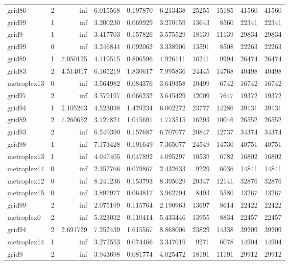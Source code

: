 \begin{longtable}{|l|r|r|r|r|r|r|r|r|r|}
grid86 & 2 & inf & 6.015568 & 0.197870 & 6.213438 & 25255 & 15185 & 41560 & 41560 \\
grid99 & 1 & inf & 3.200230 & 0.069929 & 3.270159 & 13643 & 8560 & 22341 & 22341 \\
grid9 & 1 & inf & 3.417703 & 0.157826 & 3.575529 & 18139 & 11139 & 29834 & 29834 \\
grid99 & 0 & inf & 3.246844 & 0.092062 & 3.338906 & 13591 & 8508 & 22263 & 22263 \\
grid89 & 1 & 7.050125 & 4.119515 & 0.806596 & 4.926111 & 16241 & 9994 & 26474 & 26474 \\
grid83 & 2 & 4.514017 & 6.165219 & 1.830617 & 7.995836 & 24445 & 14768 & 40498 & 40498 \\
metroplex13 & 0 & inf & 3.564982 & 0.084376 & 3.649358 & 10499 & 6742 & 16742 & 16742 \\
grid97 & 2 & inf & 3.579197 & 0.066232 & 3.645429 & 12009 & 7647 & 19372 & 19372 \\
grid94 & 1 & 2.105263 & 4.523038 & 1.479234 & 6.002272 & 23777 & 14286 & 39131 & 39131 \\
grid89 & 2 & 7.260652 & 3.727824 & 1.045691 & 4.773515 & 16293 & 10046 & 26552 & 26552 \\
grid93 & 2 & inf & 6.549390 & 0.157687 & 6.707077 & 20847 & 12737 & 34374 & 34374 \\
grid98 & 1 & inf & 7.173428 & 0.191649 & 7.365077 & 24549 & 14730 & 40751 & 40751 \\
metroplex13 & 1 & inf & 4.047405 & 0.047892 & 4.095297 & 10539 & 6782 & 16802 & 16802 \\
metroplex14 & 0 & inf & 2.352766 & 0.079867 & 2.432633 & 9229 & 6036 & 14841 & 14841 \\
metroplex12 & 0 & inf & 8.241236 & 0.153793 & 8.395029 & 20347 & 12141 & 32876 & 32876 \\
metroplex15 & 0 & inf & 3.897977 & 0.064817 & 3.962794 & 8493 & 5580 & 13267 & 13267 \\
grid99 & 2 & inf & 2.075199 & 0.115764 & 2.190963 & 13697 & 8614 & 22422 & 22422 \\
metroplex0 & 2 & inf & 5.323032 & 0.110414 & 5.433446 & 13955 & 8834 & 22457 & 22457 \\
grid94 & 2 & 2.691729 & 7.252439 & 1.615567 & 8.868006 & 23829 & 14338 & 39209 & 39209 \\
metroplex14 & 1 & inf & 3.272553 & 0.074466 & 3.347019 & 9271 & 6078 & 14904 & 14904 \\
grid9 & 2 & inf & 3.943698 & 0.081774 & 4.025472 & 18191 & 11191 & 29912 & 29912 \\

\end{longtable}
